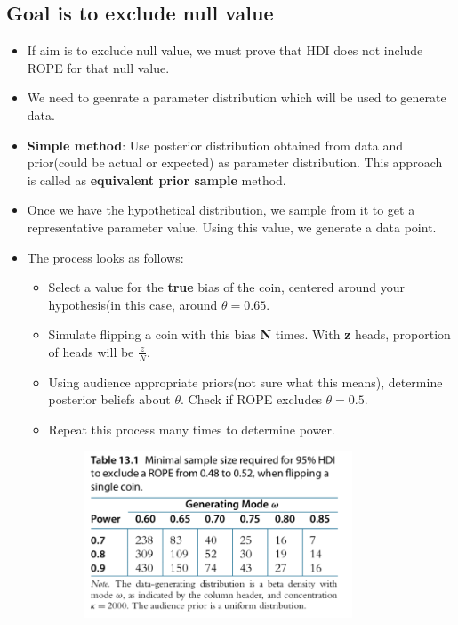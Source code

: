 \documentclass[a4paper]{article}
\begin{document}
\subsection{Goal is to exclude null value}
\begin{itemize}
    \item If aim is to exclude null value, we must prove that HDI does not include ROPE for that null value.
    \item We need to geenrate a parameter distribution which will be used to generate data.
    \item \textbf{Simple method}: Use posterior distribution obtained from data and prior(could be actual or expected) as parameter distribution. This approach is called as \textbf{equivalent prior sample} method. 
    \item Once we have the hypothetical distribution, we sample from it to get a representative parameter value. Using this value, we generate a data point.
    \item The process looks as follows:
        \begin{itemize}
            \item Select a value for the \textbf{true} bias of the coin, centered around your hypothesis(in this case, around $\theta = 0.65$. 
            \item Simulate flipping a coin with this bias \textbf{N} times. With \textbf{z} heads, proportion of heads will be $ \frac{z}{N}$. 
            \item Using audience appropriate priors(not sure what this means), determine posterior beliefs about $\theta$. Check if ROPE excludes $\theta=0.5$. 
            \item Repeat this process many times to determine power.
                \begin{figure}[H]
                    \centering
                    \includegraphics[width=0.8\textwidth]{power_table}

\end{figure}
\end{itemize}
\end{itemize}
\end{document}
